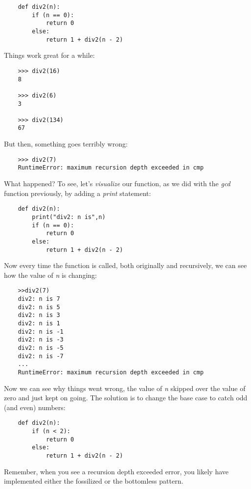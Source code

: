 \begin{verbatim}
    def div2(n):
        if (n == 0):
            return 0
        else:
            return 1 + div2(n - 2)
\end{verbatim}

Things work great for a while:

\begin{verbatim}
    >>> div2(16)
    8

    >>> div2(6)
    3

    >>> div2(134)
    67
\end{verbatim}

But then, something goes terribly wrong:

\begin{verbatim}
    >>> div2(7)
    RuntimeError: maximum recursion depth exceeded in cmp
\end{verbatim}

What happened? To see, let's {\it visualize} our function,
as we did with the {\it gcd} function previously,
by adding a {\it print} statement:

\begin{verbatim}
    def div2(n):
        print("div2: n is",n)
        if (n == 0):
            return 0
        else:
            return 1 + div2(n - 2)
\end{verbatim}

Now every time the function is called, both originally and
recursively, we can see how the value of {\it n} is changing:

\begin{verbatim}
    >>div2(7)
    div2: n is 7
    div2: n is 5
    div2: n is 3
    div2: n is 1
    div2: n is -1
    div2: n is -3
    div2: n is -5
    div2: n is -7
    ...
    RuntimeError: maximum recursion depth exceeded in cmp
\end{verbatim}

Now we can see why things went wrong, the value of {\it n}
skipped over the value of zero and just kept on going.
The solution is to change the base case to catch odd
(and even) numbers:

\begin{verbatim}
    def div2(n):
        if (n < 2):
            return 0
        else:
            return 1 + div2(n - 2)
\end{verbatim}
    
Remember, when you see a recursion depth exceeded error,
you likely have implemented either
the fossilized or the bottomless pattern.
